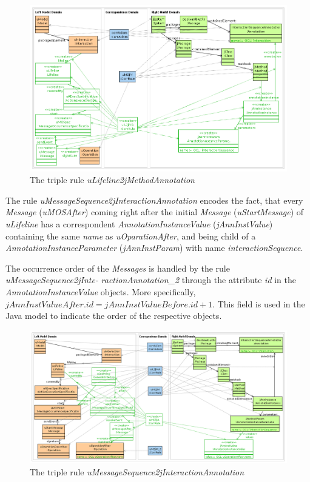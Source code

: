 \documentclass[tuberlin,cic,tc,english,noabntcite]{iiufrgs}
\begin{document}
\begin{figure}[H]
    \caption{The triple rule \emph{uLifeline2jMethodAnnotation}}
    \begin{center}
        \includegraphics[width=.8\textwidth]{uILifeline2jMAnnotation}
    \end{center}
    \label{fig:uILifeline2jMAnnotation}
\end{figure}

The rule \emph{uMessageSequence2jInteractionAnnotation} encodes the fact, that every \emph{Message} (\emph{uMOSAfter}) coming right after the initial \emph{Message} (\emph{uStartMessage}) of \emph{uLifeline} has a correspondent \emph{AnnotationInstanceValue} (\emph{jAnnInstValue}) containing the same \emph{name} as \emph{uOparationAfter}, and being child of a \emph{AnnotationInstanceParameter} (\emph{jAnnInstParam}) with name \emph{interactionSequence}.

The occurrence order of the \emph{Messages} is handled by the rule \emph{uMessageSequence2jInte-} \emph{ractionAnnotation\_2} through the attribute \emph{id} in the \emph{AnnotationInstanceValue} objects.
More specifically, $jAnnInstValueAfter.id = jAnnInstValueBefore.id + 1$. This field is used in the Java model to indicate the order of the respective objects.

\begin{figure}[H]
    \caption{The triple rule \emph{uMessageSequence2jInteractionAnnotation}}
    \begin{center}
        \includegraphics[width=.9\textwidth]{uMessageSequence2jInteractionAnnotation}
    \end{center}
    \label{fig:uMessageSequence2jInteractionAnnotation}
\end{figure}
\end{document}
